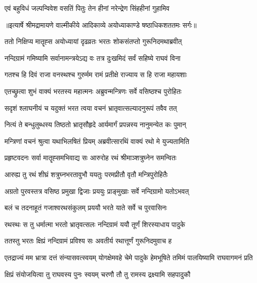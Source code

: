 \twolineshloka
{एवं बहुविधं जल्पन्विवेश वसतिं पितुः}
{तेन हीनां नरेन्द्रेण सिंहहीनां गुहामिव} %


{॥इत्यार्षे श्रीमद्रामायणे वाल्मीकीये आदिकाव्ये अयोध्याकाण्डे षष्ठाधिकशततमः सर्गः॥}


\twolineshloka
{ततो निक्षिप्य मातॄह्स अयोध्यायां दृढव्रतः}
{भरतः शोकसंतप्तो गुरूनिदमथाब्रवीत्} %

\twolineshloka
{नन्दिग्रामं गमिष्यामि सर्वानामन्त्रयेऽद्य वः}
{तत्र दुःखमिदं सर्वं सहिष्ये राघवं विना} %

\twolineshloka
{गतश्च हि दिवं राजा वनस्थश्च गुरुर्मम}
{रामं प्रतीक्षे राज्याय स हि राजा महायशाः} %

\twolineshloka
{एतच्छ्रुत्वा शुभं वाक्यं भरतस्य महात्मनः}
{अब्रुवन्मन्त्रिणः सर्वे वसिष्ठश्च पुरोहितः} %

\twolineshloka
{सदृशं श्लाघनीयं च यदुक्तं भरत त्वया}
{वचनं भ्रातृवात्सल्यादनुरूपं तवैव तत्} %

\twolineshloka
{नित्यं ते बन्धुलुब्धस्य तिष्ठतो भ्रातृसौहृदे}
{आर्यमार्गं प्रपन्नस्य नानुमन्येत कः पुमान्} %

\twolineshloka
{मन्त्रिणां वचनं श्रुत्वा यथाभिलषितं प्रियम्}
{अब्रवीत्सारथिं वाक्यं रथो मे युज्यतामिति} %

\twolineshloka
{प्रहृष्टवदनः सर्वा मातॄह्समभिवाद्य सः}
{आरुरोह रथं श्रीमाञ्शत्रुघ्नेन समन्वितः} %

\twolineshloka
{आरुह्य तु रथं शीघ्रं शत्रुघ्नभरतावुभौ}
{ययतुः परमप्रीतौ वृतौ मन्त्रिपुरोहितैः} %

\twolineshloka
{अग्रतो पुरवस्तत्र वसिष्ठ प्रमुखा द्विजाः}
{प्रययुः प्राङ्मुखाः सर्वे नन्दिग्रामो यतोऽभवत्} %

\twolineshloka
{बलं च तदनाहूतं गजाश्वरथसंकुलम्}
{प्रययौ भरते याते सर्वे च पुरवासिनः} %

\twolineshloka
{रथस्थः स तु धर्मात्मा भरतो भ्रातृवत्सलः}
{नन्दिग्रामं ययौ तूर्णं शिरस्याधाय पादुके} %

\twolineshloka
{ततस्तु भरतः क्षिप्रं नन्दिग्रामं प्रविश्य सः}
{अवतीर्य रथात्तूर्णं गुरूनिदमुवाच ह} %

\threelineshloka
{एतद्राज्यं मम भ्रात्रा दत्तं संन्यासवत्स्वयम्}
{योगक्षेमवहे चेमे पादुके हेमभूषिते}
{तमिमं पालयिष्यामि राघवागमनं प्रति} %

\twolineshloka
{क्षिप्रं संयोजयित्वा तु राघवस्य पुनः स्वयम्}
{चरणौ तौ तु रामस्य द्रक्ष्यामि सहपादुकौ} %

